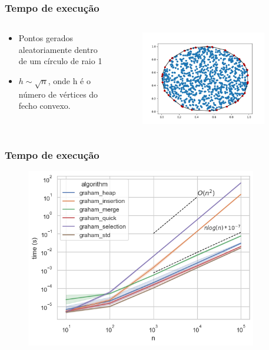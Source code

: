 \documentclass[aspectratio=169,usenames,dvipsnames]{beamer}
\begin{document}
\begin{frame}
\frametitle{Tempo de execução}
\begin{columns}
  \begin{column}{0.4\textwidth}
  \begin{itemize}
    \item Pontos gerados aleatoriamente dentro de um círculo de raio 1
    \item $h \sim \sqrt{n}$, onde h é o número de vértices do fecho convexo.
  \end{itemize}
  \end{column}
  \begin{column}{0.6\textwidth}
    \begin{figure}
      \includegraphics[width=0.9\textwidth]{./figures/random_merge_1000_1.png}
    \end{figure}
  \end{column}
\end{columns}
  
\end{frame}

\begin{frame}
\frametitle{Tempo de execução}
    \begin{figure}
      \includegraphics[width=0.9\textwidth]{./figures/circle_times.png}
    \end{figure}
\end{frame}
\end{document}
